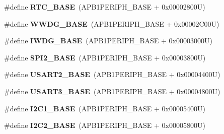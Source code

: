 \begin{DoxyCompactItemize}
\item 
\hypertarget{group___peripheral__memory__map_ga4265e665d56225412e57a61d87417022}{\#define {\bfseries R\-T\-C\-\_\-\-B\-A\-S\-E}~(A\-P\-B1\-P\-E\-R\-I\-P\-H\-\_\-\-B\-A\-S\-E + 0x00002800\-U)}\label{group___peripheral__memory__map_ga4265e665d56225412e57a61d87417022}

\item 
\hypertarget{group___peripheral__memory__map_ga9a5bf4728ab93dea5b569f5b972cbe62}{\#define {\bfseries W\-W\-D\-G\-\_\-\-B\-A\-S\-E}~(A\-P\-B1\-P\-E\-R\-I\-P\-H\-\_\-\-B\-A\-S\-E + 0x00002\-C00\-U)}\label{group___peripheral__memory__map_ga9a5bf4728ab93dea5b569f5b972cbe62}

\item 
\hypertarget{group___peripheral__memory__map_ga8543ee4997296af5536b007cd4748f55}{\#define {\bfseries I\-W\-D\-G\-\_\-\-B\-A\-S\-E}~(A\-P\-B1\-P\-E\-R\-I\-P\-H\-\_\-\-B\-A\-S\-E + 0x00003000\-U)}\label{group___peripheral__memory__map_ga8543ee4997296af5536b007cd4748f55}

\item 
\hypertarget{group___peripheral__memory__map_gac3e357b4c25106ed375fb1affab6bb86}{\#define {\bfseries S\-P\-I2\-\_\-\-B\-A\-S\-E}~(A\-P\-B1\-P\-E\-R\-I\-P\-H\-\_\-\-B\-A\-S\-E + 0x00003800\-U)}\label{group___peripheral__memory__map_gac3e357b4c25106ed375fb1affab6bb86}

\item 
\hypertarget{group___peripheral__memory__map_gade83162a04bca0b15b39018a8e8ec090}{\#define {\bfseries U\-S\-A\-R\-T2\-\_\-\-B\-A\-S\-E}~(A\-P\-B1\-P\-E\-R\-I\-P\-H\-\_\-\-B\-A\-S\-E + 0x00004400\-U)}\label{group___peripheral__memory__map_gade83162a04bca0b15b39018a8e8ec090}

\item 
\hypertarget{group___peripheral__memory__map_gabe0d6539ac0026d598274ee7f45b0251}{\#define {\bfseries U\-S\-A\-R\-T3\-\_\-\-B\-A\-S\-E}~(A\-P\-B1\-P\-E\-R\-I\-P\-H\-\_\-\-B\-A\-S\-E + 0x00004800\-U)}\label{group___peripheral__memory__map_gabe0d6539ac0026d598274ee7f45b0251}

\item 
\hypertarget{group___peripheral__memory__map_gacd72dbffb1738ca87c838545c4eb85a3}{\#define {\bfseries I2\-C1\-\_\-\-B\-A\-S\-E}~(A\-P\-B1\-P\-E\-R\-I\-P\-H\-\_\-\-B\-A\-S\-E + 0x00005400\-U)}\label{group___peripheral__memory__map_gacd72dbffb1738ca87c838545c4eb85a3}

\item 
\hypertarget{group___peripheral__memory__map_ga04bda70f25c795fb79f163b633ad4a5d}{\#define {\bfseries I2\-C2\-\_\-\-B\-A\-S\-E}~(A\-P\-B1\-P\-E\-R\-I\-P\-H\-\_\-\-B\-A\-S\-E + 0x00005800\-U)}\label{group___peripheral__memory__map_ga04bda70f25c795fb79f163b633ad4a5d}


\end{DoxyCompactItemize}
